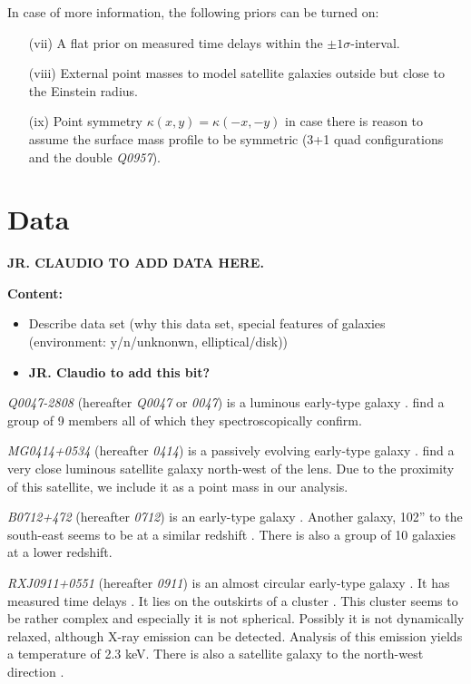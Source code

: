 \documentclass[useAMS,usenatbib]{mn2e}
\begin{document}
In case of more information, the following priors can be turned on:

\begin{enumerate}
\item[(vii)] A flat prior on measured time delays within the $\pm 1\sigma$-interval.
\item[(viii)] External point masses to model satellite galaxies outside but close to the Einstein radius.
\item[(ix)] Point symmetry $\kappa(x,y) = \kappa(-x,-y)$ in case there is reason to assume the surface mass profile to be symmetric (3+1 quad configurations and the double \textit{Q0957}).
\end{enumerate}


\section{Data}\label{sec:data}

{\bf JR. CLAUDIO TO ADD DATA HERE.} 

\textbf{Content:}
\begin{itemize}
\item Describe data set (why this data set, special features of galaxies (environment: y/n/unknonwn, elliptical/disk))

\item {\bf JR. Claudio to add this bit?} 
\end{itemize}

\textit{Q0047-2808} (hereafter \textit{Q0047} or \textit{0047}) is a luminous early-type galaxy \citep{1996MNRAS.278..139W}. \cite{2011ApJ...726...84W} find a group of 9 members all of which they spectroscopically confirm.

\textit{MG0414+0534} (hereafter \textit{0414}) is a passively evolving early-type galaxy \citep{1999AJ....117.2034T}. \cite{1993AJ....105....1S} find a very close luminous satellite galaxy north-west of the lens. Due to the proximity of this satellite, we include it as a point mass in our analysis.

\textit{B0712+472} (hereafter \textit{0712}) is an early-type galaxy \citep{1998AJ....115..377F}. Another galaxy, 102'' to the south-east seems to be at a similar redshift \citep{2002AJ....123..627F}. There is also a group of 10 galaxies at a lower redshift.

\textit{RXJ0911+0551} (hereafter \textit{0911}) is an almost circular early-type galaxy \citep{2012A&A...538A..99S}. It has measured time delays \citep{2002ApJ...572L..11H}. It lies on the outskirts of a cluster \citep{2001ApJ...555....1M}. This cluster seems to be rather complex and especially it is not spherical. Possibly it is not dynamically relaxed, although X-ray emission can be detected. Analysis of this emission yields a temperature of 2.3 keV. There is also a satellite galaxy to the north-west direction \citep{2000ApJ...544L..35K}.
\end{document}
